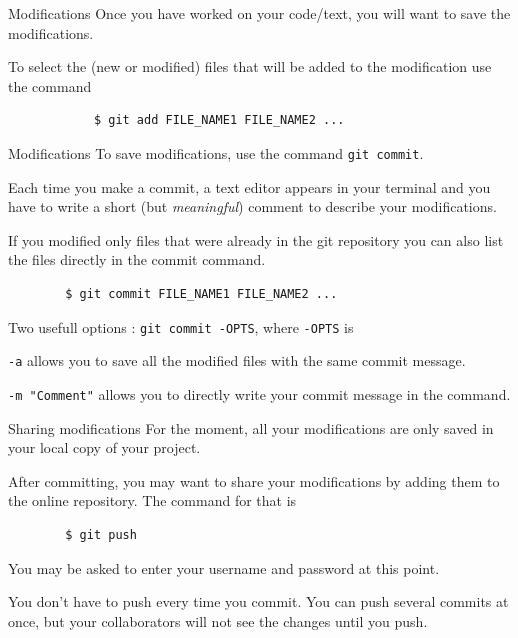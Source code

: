 \documentclass{beamer}
\begin{document}
	\begin{frame}[fragile]{Modifications}
		Once you have worked on your code/text, you will want to save the modifications. \newline
		
		To select the (new or modified) files that will be added to the modification use the command
		\begin{verbatim}
			$ git add FILE_NAME1 FILE_NAME2 ...
		\end{verbatim}
	\end{frame}

	\begin{frame}[fragile]{Modifications}	
		To save modifications, use the command \texttt{git commit}. \newline 
		
		Each time you make a commit, a text editor appears in your terminal and you have to write a short (but \textit{meaningful}) comment to describe your modifications. \newline
		
		If you modified only files that were already in the git repository you can also list the files directly in the commit command. 
		\begin{verbatim}
		$ git commit FILE_NAME1 FILE_NAME2 ...
		\end{verbatim}
		
		Two usefull options : \texttt{git commit -OPTS}, where \texttt{-OPTS} is
		
		\texttt{-a} allows you to save all the modified files with the same commit message.
		 
		\texttt{-m "Comment"} allows you to directly write your commit message in the command. 		
	\end{frame}

	\begin{frame}[fragile]{Sharing modifications}
		For the moment, all your modifications are only saved in your local copy of your project. 
		
		After committing, you may want to share your modifications by adding them to the online repository. The command for that is 
		
		\begin{verbatim}
		$ git push
		\end{verbatim}
		
		You may be asked to enter your username and password at this point.
		
		You don't have to push every time you commit. You can push several commits at once, but your collaborators will not see the changes until you push. 
	\end{frame}
	
\end{document}
